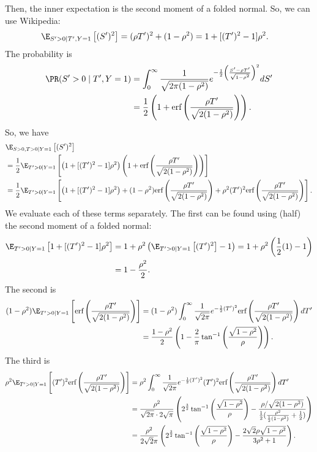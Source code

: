 \documentclass{article}
\begin{document}
Then, the inner expectation is the second moment of a folded normal.
So, we can use Wikipedia:
\begin{align}
  \E_{S'>0 \mid T', Y=1} \left[ (S')^2 \right]
  &= (\rho T')^2 + (1 - \rho^2)
  = 1 + [ (T')^2 - 1 ] \rho^2.
\end{align}
The probability is
\begin{align}
  \PR( S' > 0 \mid T', Y = 1 )
  &= \int_0^\infty \frac{1}{\sqrt{2 \pi (1 - \rho^2)}} e^{ -\frac{1}{2} \left( \frac{S' - \rho T'}{\sqrt{1 - \rho^2}} \right)^2 } dS' \\
  &= \frac{1}{2} \left( 1 + \text{erf} \left( \frac{\rho T'}{\sqrt{2(1 - \rho^2)}} \right) \right).
\end{align}
So, we have
\begin{align}
  &\E_{S>0,T>0 \mid Y=1}\left[ (S')^2 \right] \\
  &= \frac{1}{2} \E_{T'>0 \mid Y=1}\left[ \left( 1 + [ (T')^2 - 1 ] \rho^2 \right) \left( 1 + \text{erf} \left( \frac{\rho T'}{\sqrt{2(1 - \rho^2)}} \right) \right) \right] \\
  &= \frac{1}{2} \E_{T'>0 \mid Y=1}\left[ \left( 1 + [ (T')^2 - 1 ] \rho^2 \right) + (1 - \rho^2) \text{erf} \left( \frac{\rho T'}{\sqrt{2(1 - \rho^2)}} \right) + \rho^2 (T')^2 \text{erf} \left( \frac{\rho T'}{\sqrt{2(1 - \rho^2)}} \right) \right].
\end{align}
We evaluate each of these terms separately.
The first can be found using (half) the second moment of a folded normal:
\begin{align}
  \E_{T'>0 \mid Y=1}\left[ 1 + [ (T')^2 - 1 ] \rho^2 \right]
  &= 1 + \rho^2 \left( \E_{T'>0 \mid Y=1}\left[ (T')^2 \right] - 1 \right)
  = 1 + \rho^2 \left( \frac{1}{2} (1) - 1 \right) \\
  &= 1 - \frac{\rho^2}{2}.
\end{align}
The second is
\begin{align}
  (1 - \rho^2) \E_{T'>0 \mid Y=1}\left[ \text{erf} \left( \frac{\rho T'}{\sqrt{2(1 - \rho^2)}} \right) \right]
  &= (1 - \rho^2) \int_0^\infty \frac{1}{\sqrt{2 \pi}} e^{ -\frac{1}{2} (T')^2 } \text{erf} \left( \frac{\rho T'}{\sqrt{2(1 - \rho^2)}} \right) dT' \\
  &= \frac{ 1 - \rho^2 }{ 2 } \left( 1 - \frac{2}{\pi} \tan^{-1} \left( \frac{\sqrt{1 - \rho^2}}{\rho} \right) \right).
\end{align}
The third is
\begin{align}
  \rho^2 \E_{T'>0 \mid Y=1}\left[ (T')^2 \text{erf} \left( \frac{\rho T'}{\sqrt{2(1 - \rho^2)}} \right) \right]
  &= \rho^2 \int_0^\infty \frac{1}{\sqrt{2 \pi}} e^{ -\frac{1}{2} (T')^2 } (T')^2 \text{erf} \left( \frac{\rho T'}{\sqrt{2(1 - \rho^2)}} \right) dT' \\
  &= \frac{\rho^2}{\sqrt{2 \pi} \cdot 2 \sqrt{\pi}} \left( 2^{\frac{3}{2}} \tan^{-1} \left( \frac{\sqrt{1-\rho^2}}{\rho}  \right) - \frac{ \rho / \sqrt{2(1-\rho^2)} }{ \frac{1}{2} ( \frac{\rho^2}{\frac{1}{2}(1-\rho^2)} + \frac{1}{2} ) } \right) \\
  &= \frac{\rho^2}{2 \sqrt{2} \pi} \left( 2^{\frac{3}{2}} \tan^{-1} \left( \frac{\sqrt{1-\rho^2}}{\rho}  \right) - \frac{2\sqrt{2}\rho \sqrt{1-\rho^{2}}}{3\rho^{2}+1} \right).
\end{align}
\end{document}
